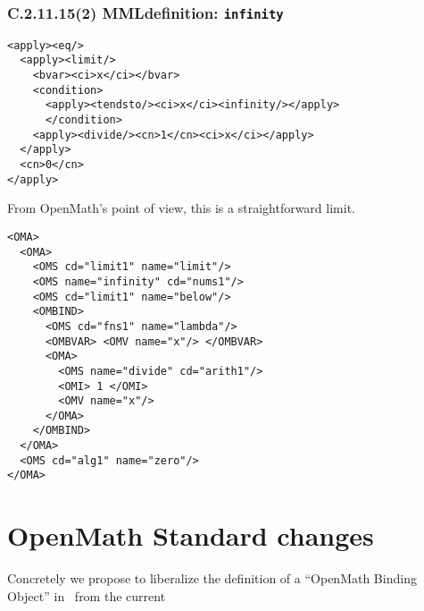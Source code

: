 \documentclass{llncs}
\begin{document}
{\subsubsection{C.2.11.15(2) MMLdefinition: {\tt infinity}}\label{C211152}
\begin{lstlisting}[language=MathML2]
<apply><eq/>
  <apply><limit/>
    <bvar><ci>x</ci></bvar>
    <condition>
      <apply><tendsto/><ci>x</ci><infinity/></apply>
      </condition>
    <apply><divide/><cn>1</cn><ci>x</ci></apply>
  </apply>
  <cn>0</cn>
</apply>
\end{lstlisting}
From OpenMath's point of view, this is a straightforward limit.
\begin{lstlisting} 
<OMA>
  <OMA>
    <OMS cd="limit1" name="limit"/>
    <OMS name="infinity" cd="nums1"/>
    <OMS cd="limit1" name="below"/>
    <OMBIND>
      <OMS cd="fns1" name="lambda"/>
      <OMBVAR> <OMV name="x"/> </OMBVAR>
      <OMA>
        <OMS name="divide" cd="arith1"/>
        <OMI> 1 </OMI>
        <OMV name="x"/>
      </OMA>
    </OMBIND>
  </OMA>
  <OMS cd="alg1" name="zero"/>
</OMA>
\end{lstlisting}
\fi

\iffull
\appendix
\section{OpenMath Standard changes}
Concretely we propose to liberalize the definition of a ``OpenMath Binding
Object'' in~\cite[section 2.1.3]{OpenMath2004a} from the current

}
\end{document}
